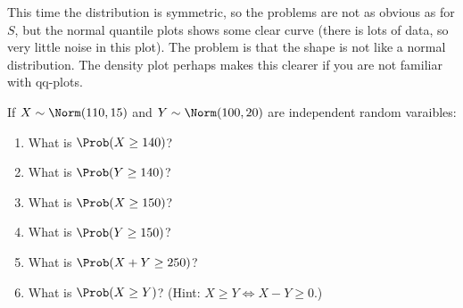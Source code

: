 \documentclass[twoside]{book}\usepackage[]{graphicx}\usepackage[]{xcolor}
\newenvironment{knitrout}{}{} %
\begin{document}
\begin{solution}
\begin{knitrout}
{}



\end{knitrout}

This time the distribution is symmetric, so the problems are not as obvious as for $S$, but the 
normal quantile plots shows some clear curve (there is lots of data, so very little noise in
this plot).  The problem is that the shape is not like a normal distribution.  
The density plot perhaps makes this clearer if you are not familiar with qq-plots.
\end{solution}

\begin{problem}
	If $X \sim \Norm( 110, 15)$ and $Y \sim \Norm(100, 20)$ are independent
	random varaibles:
	
	\begin{enumerate}
		\item
			What is $\Prob(X \ge 140)$?
		\item
			What is $\Prob(Y \ge 140)$?
		\item
			What is $\Prob(X \ge 150)$?
		\item
			What is $\Prob(Y \ge 150)$?
		\item
			What is $\Prob(X + Y \ge 250)$?
		\item
			What is $\Prob(X \ge Y)$? (Hint: $X \ge Y \Leftrightarrow X - Y \ge 0$.)
	\end{enumerate}
\end{problem}
\end{document}
